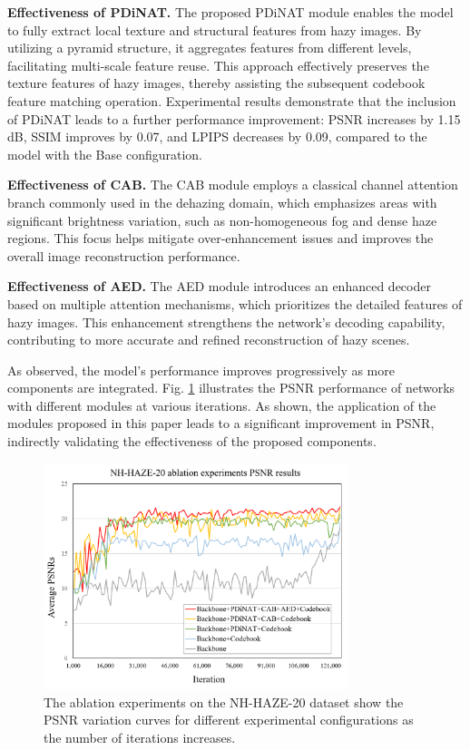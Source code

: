 \documentclass[journal]{IEEEtran}
\begin{document}
	{\bf{Effectiveness of PDiNAT.}} The proposed PDiNAT module enables the model to fully extract local texture and structural features from hazy images. By utilizing a pyramid structure, it aggregates features from different levels, facilitating multi-scale feature reuse. This approach effectively preserves the texture features of hazy images, thereby assisting the subsequent codebook feature matching operation. Experimental results demonstrate that the inclusion of PDiNAT leads to a further performance improvement: PSNR increases by 1.15 dB, SSIM improves by 0.07, and LPIPS decreases by 0.09, compared to the model with the Base configuration.

	{\bf{Effectiveness of CAB.}} The CAB module employs a classical channel attention branch commonly used in the dehazing domain, which emphasizes areas with significant brightness variation, such as non-homogeneous fog and dense haze regions. This focus helps mitigate over-enhancement issues and improves the overall image reconstruction performance.

	{\bf{Effectiveness of AED.}} The AED module introduces an enhanced decoder based on multiple attention mechanisms, which prioritizes the detailed features of hazy images. This enhancement strengthens the network’s decoding capability, contributing to more accurate and refined reconstruction of hazy scenes.

As observed, the model's performance improves progressively as more components are integrated. Fig. \ref{Ablation_study_2} illustrates the PSNR performance of networks with different modules at various iterations. As shown, the application of the modules proposed in this paper leads to a significant improvement in PSNR, indirectly validating the effectiveness of the proposed components.

\begin{figure}[!t]
	\centering
	\includegraphics[width=3.49in]{images/ablation_experiments}
	\caption{The ablation experiments on the NH-HAZE-20 dataset show the PSNR variation curves for different experimental configurations as the number of iterations increases.}
	\label{Ablation_study_2}
\end{figure}
\end{document}
